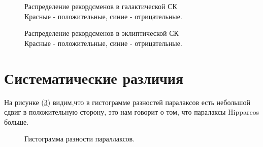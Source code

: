 \documentclass[14pt]{article} %
\begin{document}
\begin{figure}[h!]
\caption{Распределение рекордсменов в галактической СК\\Красные - положительные, синие - отрицательные.}
\label{img:75maxlb}
\end{figure}

\begin{figure}[h!]
\caption{Распределение рекордсменов в эклиптической СК\\Красные - положительные, синие - отрицательные.}
\label{img:75maxlonlat}
\end{figure}

\section{Систематические различия}\label{sistem}
На рисунке (\ref{img:hist_par_deff}) видим,что в гистограмме разностей паралаксов есть небольшой сдвиг в положительную сторону, это нам говорит о том, что паралаксы Hipparcos больше.

\begin{figure}[h!]
\caption{Гистограмма разности параллаксов.}
\label{img:hist_par_deff}
\end{figure}
\end{document}
